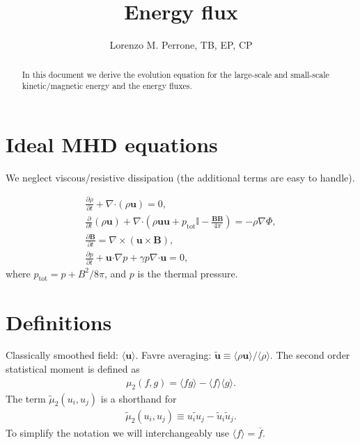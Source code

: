 \documentclass[]{article}
\title{Energy flux}
\author{Lorenzo M. Perrone, TB, EP, CP}
\newcommand{\bcdot}{\bm{\cdot}}
\begin{document}
\maketitle

\begin{abstract}
In this document we derive the evolution equation for the large-scale and small-scale kinetic/magnetic energy and the energy fluxes.
\end{abstract}

\section{Ideal MHD equations}

We neglect viscous/resistive dissipation (the additional terms are easy to handle).

\begin{align}
	\frac{\partial \rho}{\partial t} + \nabla \bcdot \left(\rho \bm u \right) = 0, \\
	\frac{\partial }{\partial t} \left(\rho \bm u \right) + \nabla \bcdot \left( \rho \bm u \bm u  + p_{\mathrm{tot}} \mathbb{I}  - \frac{\bm B \bm B}{4 \pi} \right) = - \rho \nabla \Phi , \\
	\frac{\partial \bm B}{\partial t} = \nabla \times \left( \bm u \times \bm B \right), \\
	\frac{\partial p}{\partial t} + \bm u \bcdot \nabla p + \gamma p \nabla \bcdot \bm u = 0, \label{eq:thermal_pressure}
\end{align}
%
where $p_{\mathrm{tot}} = p + B^2 / 8\pi$, and $p$ is the thermal pressure. 

\section{Definitions}

Classically smoothed field: $\langle \bm u \rangle$. Favre averaging: $\tilde{\bm u} \equiv \langle \rho \bm u \rangle / \langle \rho \rangle$. The second order statistical moment is defined as
%
\begin{align}
	\mu_2 (f, g) = \langle f g \rangle - \langle f \rangle \langle g \rangle.
\end{align}
%
The term $\tilde{\mu}_2 (u_i, u_j)$ is a shorthand for
%
\begin{align}
	\tilde{\mu}_2 (u_i, u_j) \equiv \widetilde{u_i u_j} - \tilde{u}_i \tilde{u}_j.
\end{align}
%
To simplify the notation we will interchangeably use $\langle f \rangle = \overline{f}$.
\end{document}
